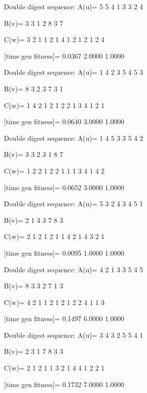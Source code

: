 Double digest sequence:
A(u)=
     5     5     4     1     3     3     2     4

B(v)=
     3     3     1     2     8     3     7

C(w)=
     3     2     1     1     2     1     4     1     2     1     2     1     2     4

[time gen fitness]=
    0.0367    2.0000    1.0000

Double digest sequence:
A(u)=
     1     4     2     3     5     4     5     3

B(v)=
     8     3     2     3     7     3     1

C(w)=
     1     4     2     1     2     1     2     2     1     3     4     1     2     1

[time gen fitness]=
    0.0640    3.0000    1.0000

Double digest sequence:
A(u)=
     1     4     5     3     3     5     4     2

B(v)=
     3     3     2     3     1     8     7

C(w)=
     1     2     2     1     2     2     1     1     1     3     4     1     4     2

[time gen fitness]=
    0.0652    3.0000    1.0000

Double digest sequence:
A(u)=
     5     3     2     4     3     4     5     1

B(v)=
     2     1     3     3     7     8     3

C(w)=
     2     1     2     1     2     1     1     4     2     1     4     3     2     1

[time gen fitness]=
    0.0095    1.0000    1.0000

Double digest sequence:
A(u)=
     4     2     1     3     3     5     4     5

B(v)=
     8     3     3     2     7     1     3

C(w)=
     4     2     1     1     2     1     2     1     2     2     4     1     1     3

[time gen fitness]=
    0.1497    6.0000    1.0000

Double digest sequence:
A(u)=
     3     4     3     2     5     5     4     1

B(v)=
     2     3     1     7     8     3     3

C(w)=
     2     1     2     1     1     3     2     1     4     4     1     2     2     1

[time gen fitness]=
    0.1732    7.0000    1.0000

